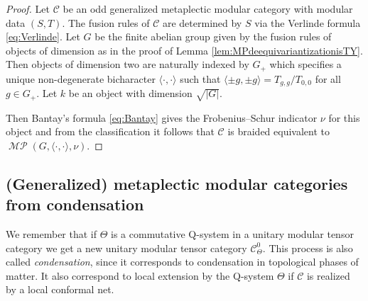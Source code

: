 \documentclass[twoside,11pt,reqno]{amsart}
\theoremstyle{definition}
\theoremstyle{remark}
\newcommand{\cC}{\mathcal{C}}
\DeclareMathOperator*{\MP}{\mathcal{MP}}
\newcommand{\bi}[2]{\langle #1,#2\rangle}
\newcommand{\bislotslot}{\bi\cdot\cdot}
\newcommand{\myemph}[1]{\emph{#1}}
\begin{document}
\begin{proof} 
  Let $\cC$ be an odd generalized metaplectic modular category with modular 
  data $(S,T)$. The fusion rules of $\cC$ are determined by 
  $S$ via the Verlinde formula  \eqref{eq:Verlinde}.
  Let $G$ be the finite abelian group given by the fusion rules
  of objects of dimension as in the proof of 
  Lemma \ref{lem:MPdeequivariantizationisTY}.
  Then objects of dimension two are naturally indexed by $G_+$ which specifies 
  a unique non-degenerate bicharacter $\bislotslot$ such that 
  $\bi {\pm g}{\pm g} =T_{g,g}/T_{0,0}$ for all $g\in G_+$.
  Let $k$ be an object with dimension $\sqrt{|G|}$. 
  
  Then Bantay's formula \eqref{eq:Bantay} gives the Frobenius--Schur indicator 
  $\nu$ for this object and from the 
  classification it follows that $\cC$ is braided equivalent 
  to $\MP(G,\bislotslot,\nu)$.
\end{proof}

\subsection{(Generalized) metaplectic modular categories from condensation}
We remember that if $\Theta$ is a commutative Q-system in a 
unitary modular tensor category we get a new unitary modular tensor category 
$\cC_\Theta^0$. 
This process is also called \myemph{condensation}, since it corresponds to 
condensation in topological phases of matter. 
It also correspond to local extension by the Q-system $\Theta$ if 
$\cC$ is realized by a local conformal net.
\end{document}
